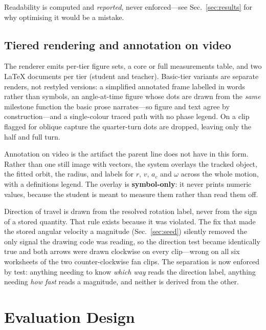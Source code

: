 \documentclass[conference]{IEEEtran}
\newcommand{\ac}{a_{c}}
\begin{document}
Readability is computed and \emph{reported}, never enforced---see
Sec.~\ref{sec:results} for why optimising it would be a mistake.

\subsection{Tiered rendering and annotation on video}

The renderer emits per-tier figure sets, a core or full measurements table, and
two LaTeX documents per tier (student and teacher). Basic-tier variants are
separate renders, not restyled versions: a simplified annotated frame labelled
in words rather than symbols, an angle-at-time figure whose dots are drawn from
the \emph{same} milestone function the basic prose narrates---so figure and
text agree by construction---and a single-colour traced path with no phase
legend. On a clip flagged for oblique capture the quarter-turn dots are
dropped, leaving only the half and full turn.

Annotation on video is the artifact the parent line does not have in this form.
Rather than one still image with vectors, the system overlays the tracked
object, the fitted orbit, the radius, and labels for $r$, $v$, $\ac$ and
$\omega$ across the whole motion, with a definitions legend. The overlay is
\textbf{symbol-only}: it never prints numeric values, because the student is
meant to measure them rather than read them off.

Direction of travel is drawn from the resolved rotation label, never from the
sign of a stored quantity. That rule exists because it was violated. The fix
that made the stored angular velocity a magnitude (Sec.~\ref{sec:seed})
silently removed the only signal the drawing code was reading, so the direction
test became identically true and both arrows were drawn clockwise on every
clip---wrong on all six worksheets of the two counter-clockwise fan clips. The
separation is now enforced by test: anything needing to know \emph{which way}
reads the direction label, anything needing \emph{how fast} reads a magnitude,
and neither is derived from the other.

\section{Evaluation Design}
\label{sec:evaldesign}
\end{document}
